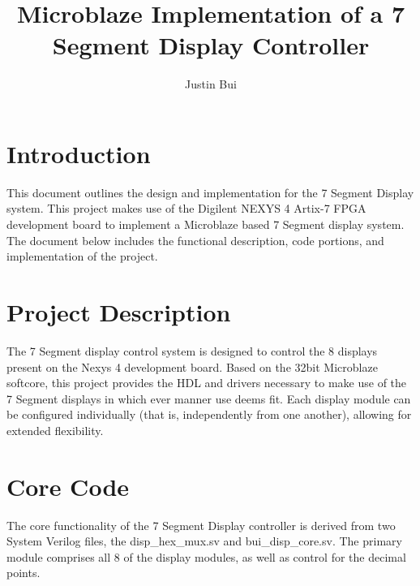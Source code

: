 \documentclass{article}
\author{Justin Bui}
\title{Microblaze Implementation of a 7 Segment Display Controller}
\begin{document}
\maketitle
\newpage

\tableofcontents
\newpage

\section{Introduction}
This document outlines the design and implementation for the 7 Segment Display system. This project makes use of the Digilent NEXYS 4 Artix-7 FPGA development board to implement a Microblaze based 7 Segment display system. The document below includes the functional description, code portions, and implementation of the project. 


\section{Project Description}
The 7 Segment display control system is designed to control the 8 displays present on the Nexys 4 development board. Based on the 32bit Microblaze softcore, this project provides the HDL and drivers necessary to make use of the 7 Segment displays in which ever manner use deems fit. Each display module can be configured individually (that is, independently from one another), allowing for extended flexibility. 

\section{Core Code}
The core functionality of the 7 Segment Display controller is derived from two System Verilog files, the disp\_hex\_mux.sv and bui\_disp\_core.sv. The primary module comprises all 8 of the display modules, as well as control for the decimal points. 
\end{document}
